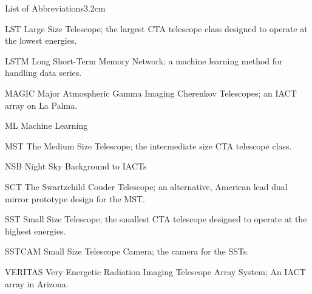 \begin{mclistof}{List of Abbreviations}{3.2cm}
\item[LST] Large Size Telescope; the largest CTA telescope class designed to operate at the lowest energies.
\item[LSTM] Long Short-Term Memory Network; a machine learning method for handling data series.
\item[MAGIC] Major Atmospheric Gamma Imaging Cherenkov Telescopes; an IACT array on La Palma.
\item[ML] Machine Learning
\item[MST] The Medium Size Telescope; the intermediate size CTA telescope class.
\item[NSB] Night Sky Background to IACTs
\item[SCT] The Swartzchild Couder Telescope; an alternative, American lead dual mirror prototype design for the MST.
\item[SST] Small Size Telescope; the smallest CTA telescope designed to operate at the highest energies.
\item[SSTCAM] Small Size Telescope Camera; the camera for the SSTs.
\item[VERITAS] Very Energetic Radiation Imaging Telescope Array System; An IACT array in Arizona.

\end{mclistof} 
